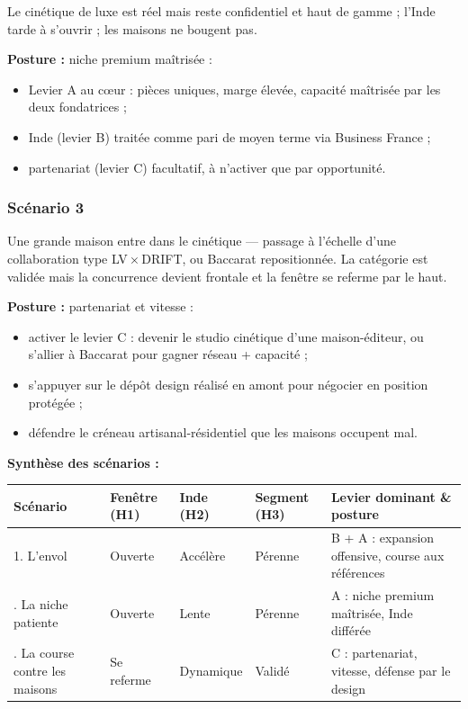 \documentclass[11pt,a4paper]{article}
\begin{document}
Le cinétique de luxe est réel mais reste confidentiel et haut de gamme ; l'Inde tarde à s'ouvrir ; les maisons ne bougent pas.

\textbf{Posture :} niche premium maîtrisée :
\begin{itemize}
  \item Levier A au cœur : pièces uniques, marge élevée, capacité maîtrisée par les deux fondatrices ;
  \item Inde (levier B) traitée comme pari de moyen terme via Business France ;
  \item partenariat (levier C) facultatif, à n'activer que par opportunité.
\end{itemize}

\subsubsection*{Scénario 3}

Une grande maison entre dans le cinétique — passage à l'échelle d'une collaboration type LV\,×\,DRIFT, ou Baccarat repositionnée. La catégorie est validée mais la concurrence devient frontale et la fenêtre se referme par le haut.

\textbf{Posture :} partenariat et vitesse :
\begin{itemize}
  \item activer le levier C : devenir le studio cinétique d'une maison-éditeur, ou s'allier à Baccarat pour gagner réseau + capacité ;
  \item s'appuyer sur le dépôt design réalisé en amont pour négocier en position protégée ;
  \item défendre le créneau artisanal-résidentiel que les maisons occupent mal.
\end{itemize}

\vspace{0.6em}

\textbf{Synthèse des scénarios :}

\vspace{0.4em}
\begin{center}
\begin{tabularx}{\linewidth}{L{3.8cm} C{2.0cm} C{1.8cm} C{2.0cm} X}
\toprule
\textbf{Scénario} & \textbf{Fenêtre (H1)} & \textbf{Inde (H2)} & \textbf{Segment (H3)} & \textbf{Levier dominant \& posture} \\
. L'envol & Ouverte & Accélère & Pérenne & B + A : expansion offensive, course aux références \\
. La niche patiente & Ouverte & Lente & Pérenne & A : niche premium maîtrisée, Inde différée \\
. La course contre les maisons & Se referme & Dynamique & Validé & C : partenariat, vitesse, défense par le design \\
\bottomrule
\end{tabularx}
\end{center}
\end{document}
